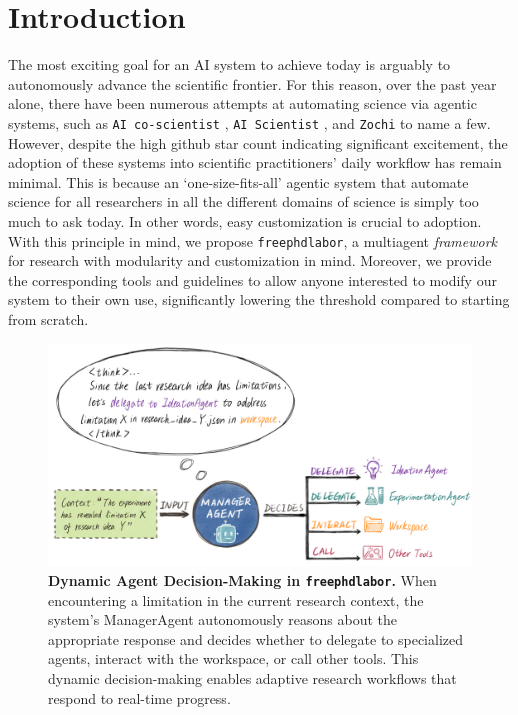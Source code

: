 \documentclass{article}
\begin{document}
\section{Introduction}
\label{sec:intro}
The most exciting goal for an AI system to achieve today is arguably to autonomously advance the scientific frontier. For this reason, over the past year alone, there have been numerous attempts at automating science via agentic systems, such as \texttt{AI co-scientist} \cite{gottweisAICoscientist2025a}, \texttt{AI Scientist} \cite{luAIScientistFully2024b}, and \texttt{Zochi} \cite{zhouZochiTechnicalReport2025} to name a few. However, despite the high github star count indicating significant excitement, the adoption of these systems into scientific practitioners' daily workflow has remain minimal. 
This is because an `one-size-fits-all' agentic system that automate science for all researchers in all the different domains of science is simply too much to ask today. In other words, easy customization is crucial to adoption. With this principle in mind, we propose \texttt{freephdlabor}, a multiagent \textit{framework} for research with modularity and customization in mind. Moreover, we provide the corresponding tools and guidelines to allow anyone interested to modify our system to their own use, significantly lowering the threshold compared to starting from scratch.
\begin{figure}[ht]
\vskip 0.2in
\begin{center}
\centerline{\includegraphics[width=\columnwidth]{figures/decision}}
\caption{\textbf{Dynamic Agent Decision-Making in \texttt{freephdlabor}.} When encountering a limitation in the current research context, the system's ManagerAgent autonomously reasons about the appropriate response and decides whether to delegate to specialized agents, interact with the workspace, or call other tools. This dynamic decision-making enables adaptive research workflows that respond to real-time progress.}
\label{fig:decision}
\end{center}
\vskip -0.2in
\end{figure}
\end{document}
